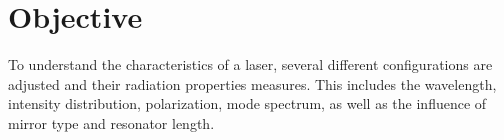 \section{Objective}

To understand the characteristics of a \HeNe laser, several different configurations are adjusted and their radiation properties measures. This
includes the wavelength, intensity distribution, polarization, mode spectrum, as well as the influence of mirror type and resonator length.
